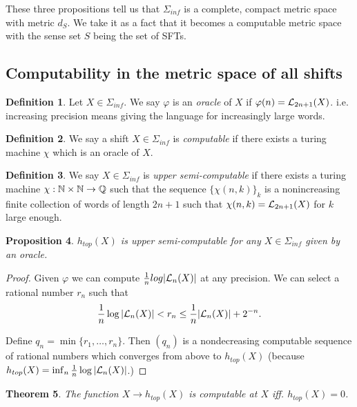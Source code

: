 \documentclass[11pt, reqno]{amsart}
\theoremstyle{plain}
\newtheorem{thm}{Theorem}[section]
\numberwithin{thm}{subsection}
\newtheorem{prop}[thm]{Proposition}
\theoremstyle{definition}
\newtheorem{defn}[thm]{Definition}
\begin{document}
These three propositions tell us that $\Sigma_{inf}$ is a complete, compact metric space with metric $d_S$. We take it as a fact that it becomes a computable metric space with the sense set $S$ being the set of SFTs.

\subsection{Computability in the metric space of all shifts}\cite[L7]{wolf}  

\begin{defn}
  Let $X \in \Sigma_{inf}$. We say $\varphi$ is an \textit{oracle} of $X$ if $\varphi(n) = \mathcal{L}_{2n+1}(X)$. i.e. increasing precision means giving the language for increasingly large words.
\end{defn}

\begin{defn}
  We say a shift $X \in \Sigma_{inf}$ is \textit{computable} if there exists a turing machine $\chi$ which is an oracle of $X$.
\end{defn}

\begin{defn}
  We say $X \in \Sigma_{inf}$ is \textit{upper semi-computable} if there exists a turing machine $\chi: \mathbb{N} \times \mathbb{N} \rightarrow \mathbb{Q}$ such that the sequence $\{\chi(n,k)\}_k$ is a nonincreasing finite collection of words of length $2n+1$ such that $\chi(n,k) = \mathcal{L}_{2n+1}(X)$ for $k$ large enough.
\end{defn}



\begin{prop}
  $h_{top}(X)$ is upper semi-computable for any $X \in \Sigma_{inf}$ given by an oracle.
\end{prop}

\begin{proof}
  Given $\varphi$ we can compute $\frac{1}{n}log|\mathcal{L}_n(X)|$ at any precision. We can select a rational number $r_n$ such that 
  $$\frac{1}{n}\log|\mathcal{L}_n(X)| < r_n \leq \frac{1}{n}|\mathcal{L}_n(X)|+2^{-n}.$$

  Define $q_n = \min\{r_1, \dots, r_n\}$. Then $(q_n)$ is a nondecreasing computable sequence of rational numbers which converges from above to $h_{top}(X)$ (because $h_{top}(X) = \inf_{n}\frac{1}{n}\log|\mathcal{L}_n(X)|$.)
\end{proof}

\begin{thm}
  The function $X \rightarrow h_{top}(X)$ is computable at $X$ iff. $h_{top}(X) = 0$.
\end{thm}
\end{document}
